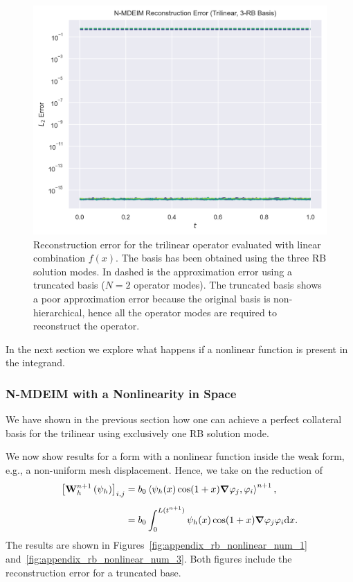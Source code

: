 \documentclass[../../thesis.tex]{subfiles}
\newcommand{\inner}[2]{\left<#1, #2\right>}
\newcommand{\Ah}[1]{\ensuremath{\vb{#1}^{n+1}_h}}
\begin{document}
\begin{figure}[h]
    \includegraphics[width=\columnwidth]{research_project/piston/figures/svd_fourier/trilinear_nonlinear/rb_basis_mdeim_errors_trilinear_num_3.png}
    \caption{Reconstruction error for the trilinear operator evaluated with linear combination $f(x)$.
    The basis has been obtained using the three RB solution modes.
    In dashed is the approximation error using a truncated basis ($N=2$ operator modes). 
    The truncated basis shows a poor approximation error because the original basis is non-hierarchical, 
    hence all the operator modes are required to reconstruct the operator.}
    \label{fig:appendix_rb_trilinear_num_3}
\end{figure}
In the next section we explore what happens if a nonlinear function is present in the integrand.

\newpage
\subsubsection{N-MDEIM with a Nonlinearity in Space}
We have shown in the previous section how 
one can achieve a perfect collateral basis for the trilinear using exclusively one RB solution mode.

We now show results for a form with a nonlinear function inside the weak form, e.g., 
a non-uniform mesh displacement. 
Hence, we take on the reduction of
\begin{equation}
    \begin{split}
        \qty[\Ah{W}\left(\psi_{h}\right)]_{i,j}
        &= b_0 \inner{\psi_h(x) \cos(1+x) \grad \varphi_j}{\varphi_i}^{n+1},
        \\[2mm]
        &= b_0 \int_{0}^{L(t^{n+1})} \psi_h(x) \cos(1+x) \grad \varphi_j \varphi_i \dd x.
    \end{split}
\end{equation}
The results are shown in Figures~\ref{fig:appendix_rb_nonlinear_num_1} 
and~\ref{fig:appendix_rb_nonlinear_num_3}.
Both figures include the reconstruction error for a truncated base.
\end{document}
